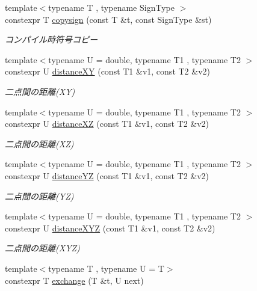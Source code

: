 \begin{DoxyCompactItemize}
{\footnotesize template$<$typename T , typename Sign\+Type $>$ }\\constexpr T \mbox{\hyperlink{namespacesaki_a1791113a346dea4c2d7fd8e120016038}{copysign}} (const T \&t, const Sign\+Type \&st)
\begin{DoxyCompactList}\small\item\em コンパイル時符号コピー \end{DoxyCompactList}\item 
{\footnotesize template$<$typename U  = double, typename T1 , typename T2 $>$ }\\constexpr U \mbox{\hyperlink{namespacesaki_ac7860b024b9f60e5d2426448504cdfa5}{distance\+XY}} (const T1 \&v1, const T2 \&v2)
\begin{DoxyCompactList}\small\item\em 二点間の距離(\+X\+Y) \end{DoxyCompactList}\item 
{\footnotesize template$<$typename U  = double, typename T1 , typename T2 $>$ }\\constexpr U \mbox{\hyperlink{namespacesaki_aa160b674649d86e048ff2676e20b0d25}{distance\+XZ}} (const T1 \&v1, const T2 \&v2)
\begin{DoxyCompactList}\small\item\em 二点間の距離(\+X\+Z) \end{DoxyCompactList}\item 
{\footnotesize template$<$typename U  = double, typename T1 , typename T2 $>$ }\\constexpr U \mbox{\hyperlink{namespacesaki_a430390838f23403a3efc4182aed002b1}{distance\+YZ}} (const T1 \&v1, const T2 \&v2)
\begin{DoxyCompactList}\small\item\em 二点間の距離(\+Y\+Z) \end{DoxyCompactList}\item 
{\footnotesize template$<$typename U  = double, typename T1 , typename T2 $>$ }\\constexpr U \mbox{\hyperlink{namespacesaki_aca24fd78c511e7ccd8f14a9c04eff7e9}{distance\+X\+YZ}} (const T1 \&v1, const T2 \&v2)
\begin{DoxyCompactList}\small\item\em 二点間の距離(\+X\+Y\+Z) \end{DoxyCompactList}\item 
{\footnotesize template$<$typename T , typename U  = T$>$ }\\constexpr T \mbox{\hyperlink{namespacesaki_ad2deeae63db0667c034ff616bf6e3886}{exchange}} (T \&t, U next)

\end{DoxyCompactItemize}
